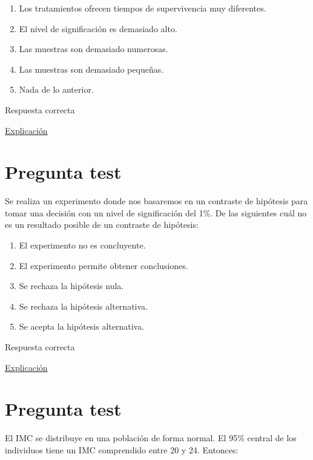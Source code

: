 \documentclass[
]{book}
\providecommand{\tightlist}{%
  \setlength{\itemsep}{0pt}\setlength{\parskip}{0pt}}
\begin{document}
\begin{enumerate}
\def\labelenumi{\alph{enumi})}
\tightlist
\item
  Los tratamientos ofrecen tiempos de supervivencia muy diferentes.
\item
  El nivel de significación es demasiado alto.
\item
  Las muestras son demasiado numerosas.
\item
  Las muestras son demasiado pequeñas.
\item
  Nada de lo anterior.
\end{enumerate}

Respuesta correcta

\href{https://1fjmanzano.github.io/bioestadistica/contrastes-de-hipo\%CC\%81tesis.html}{Explicación}

\hypertarget{pregunta-test-112}{%
\section{Pregunta test}\label{pregunta-test-112}}

Se realiza un experimento donde nos basaremos en un contraste de hipótesis para tomar una decisión con un nivel de significación del 1\%. De las siguientes cuál no es un resultado posible de un contraste de hipótesis:

\begin{enumerate}
\def\labelenumi{\alph{enumi})}
\tightlist
\item
  El experimento no es concluyente.
\item
  El experimento permite obtener conclusiones.
\item
  Se rechaza la hipótesis nula.
\item
  Se rechaza la hipótesis alternativa.
\item
  Se acepta la hipótesis alternativa.
\end{enumerate}

Respuesta correcta

\href{https://1fjmanzano.github.io/bioestadistica/contrastes-de-hipo\%CC\%81tesis.html}{Explicación}

\hypertarget{pregunta-test-113}{%
\section{Pregunta test}\label{pregunta-test-113}}

El IMC se distribuye en una población de forma normal. El 95\% central de los individuos tiene un IMC comprendido entre 20 y 24. Entonces:
\end{document}
